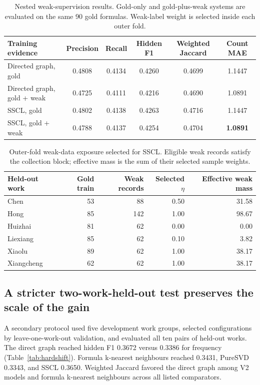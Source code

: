 \documentclass[11pt,a4paper]{article}
\newcommand{\SSCL}{\textsc{SSCL}}
\begin{document}
\begin{table}[t]
\centering
\caption{Nested weak-supervision results. Gold-only and gold-plus-weak systems are evaluated on the same 90 gold formulas. Weak-label weight is selected inside each outer fold.}
\label{tab:weakresults}
\begin{tabular}{lSSSSS}
\toprule
Training evidence & {Precision} & {Recall} & {Hidden F1} & {Weighted Jaccard} & {Count MAE} \\
\midrule
Directed graph, gold & 0.4808 & 0.4134 & 0.4260 & 0.4699 & 1.1447 \\
Directed graph, gold + weak & 0.4725 & 0.4111 & 0.4216 & 0.4690 & 1.0891 \\
\SSCL{}, gold & 0.4802 & 0.4138 & 0.4263 & 0.4716 & 1.1447 \\
\SSCL{}, gold + weak & 0.4788 & 0.4137 & 0.4254 & 0.4704 & \bfseries 1.0891 \\
\bottomrule
\end{tabular}
\end{table}

\begin{table}[t]
\centering
\caption{Outer-fold weak-data exposure selected for \SSCL{}. Eligible weak records satisfy the collection block; effective mass is the sum of their selected sample weights.}
\label{tab:weakfolds}
\begin{tabular}{lrrrr}
\toprule
Held-out work & Gold train & Weak records & Selected $\eta$ & Effective weak mass \\
\midrule
Chen & 53 & 88 & 0.50 & 31.58 \\
Hong & 85 & 142 & 1.00 & 98.67 \\
Huizhai & 81 & 62 & 0.00 & 0.00 \\
Liexiang & 85 & 62 & 0.10 & 3.82 \\
Xiaolu & 89 & 62 & 1.00 & 38.17 \\
Xiangcheng & 62 & 62 & 1.00 & 38.17 \\
\bottomrule
\end{tabular}
\end{table}

\subsection{A stricter two-work-held-out test preserves the scale of the gain}

A secondary protocol used five development work groups, selected configurations by leave-one-work-out validation, and evaluated all ten pairs of held-out works. The direct graph reached hidden F1 0.3672 versus 0.3386 for frequency (Table~\ref{tab:hardshift}). Formula k-nearest neighbours reached 0.3431, PureSVD 0.3343, and \SSCL{} 0.3650. Weighted Jaccard favored the direct graph among V2 models and formula k-nearest neighbours across all listed comparators.
\end{document}
